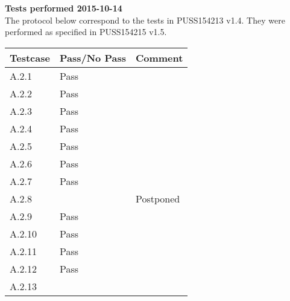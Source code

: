 \renewcommand{\testdate}{2015-10-14}
\textbf{Tests performed \testdate} \\
The protocol below correspond to the tests in PUSS154213 v1.4. They were performed as specified in PUSS154215 v1.5.
	\begin{center}
  		\begin{tabular}{| p{3cm} | p{5cm} | p{5cm} |}
    		\hline
	    	\textbf{Testcase}			& \textbf{Pass/No Pass} 	& \textbf{Comment} \\ \hline
    		A.2.1		 						&  Pass										&  				\\ \hline
    		A.2.2		 						&  Pass										& 				 \\	\hline
    		A.2.3		 						&  Pass											& 				 \\	\hline
    		A.2.4		 						&  Pass										& 				 \\	\hline
    		A.2.5		 						&  Pass										& 				 \\	\hline
    		A.2.6		 						&  Pass										& 				 \\	\hline
    		A.2.7		 						&  Pass										& 				 \\	\hline
    		A.2.8		 						&  											&  Postponed				 \\	\hline
    		A.2.9		 						&  Pass										& 				 \\	\hline
    		A.2.10	 							&  Pass										& 				 \\	\hline
    		A.2.11	 							&  Pass										& 				 \\	\hline
    		A.2.12	 							&  Pass										& 				 \\	\hline
    		A.2.13	 							&  											& 				 \\	\hline
 		 \end{tabular}
	\end{center}